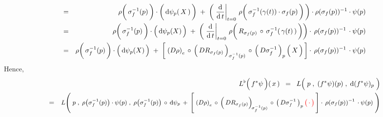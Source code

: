 \begin{eqnarray*}
& = &
    \rho\!\left(\,\overset{{\color{white}.}}{
        \sigma_{f}^{-1}(p)
        }\,\right)
    \cdot
    \left(\,\overset{{\color{white}1}}{
        \d\psi_{p}(\,X\,)
        }\,\right)
    \; + \;
    \left(\,
        \left.\dfrac{\d}{\d\,t}\right\vert_{t=0}
        \,
        \rho\!\left(\,\overset{{\color{white}.}}{
            \sigma_{f}^{-1}(\gamma(t))
            \cdot
            \sigma_{f}(p)
            }\,\right)
        \,\right)
    \cdot
    {\color{black}\rho(\sigma_{f}(p))^{-1}}
    \cdot
    \psi(p)
\\
& = &
    \rho\!\left(\,\overset{{\color{white}.}}{
        \sigma_{f}^{-1}(p)
        }\,\right)
    \cdot
    \left(\,\overset{{\color{white}.}}{
        \d\psi_{p}(X)
        }\,\right)
    \; + \;
    \left(\,
        \left.\dfrac{\d}{\d\,t}\right\vert_{t=0}
        \,
        \rho\!\left(\,\overset{{\color{white}.}}{
            R_{\sigma_{f}(p)}
            \,\circ\,
            \sigma_{f}^{-1}(\,\gamma(t)\,)
            }\,\right)
        \right)
    \cdot\,
    {\color{black}\rho(\sigma_{f}(p))^{-1}}
    \,\cdot
    \psi(p)
\\
& = &
    \rho\!\left(\,\overset{{\color{white}.}}{
        \sigma_{f}^{-1}(p)
        }\,\right)
    \cdot
    \left(\,\overset{{\color{white}.}}{
        \d\psi_{p}(X)
        }\,\right)
    \; + \;
    \left[\;
        \left(D\rho\right)_{e}
        \,\circ\,
        \left(\,D\overset{{\color{white}.}}{R_{\sigma_{f}(p)}}\,\right)_{\sigma_{f}^{-1}(p)}
        \,\circ\,
        \left(\,D\sigma_{f}^{-1}\,\right)_{p}
        \left(\,\overset{{\color{white}.}}{X}\,\right)
        \,\right]
    \cdot\,
    {\color{black}\rho(\sigma_{f}(p))^{-1}}
    \,\cdot
    \psi(p)
\end{eqnarray*}
Hence,
\begin{eqnarray*}
&&
    L^{\flat}\!\left(\,\overset{{\color{white}.}}{f^{*}\psi}\,\right)\!(\,x\,)
\;\; = \;\;
    L\!\left(\;
        \overset{{\color{white}1}}{p}
        \;,\;
        (f^{*}\psi)(p)
        \;,\;
        \d(f^{*}\psi)_{p}
        \;\right)
\\
& = &
    \textnormal{\small$
    L\!\left(\;
        p
        \;,\;
        \rho\!\left(\sigma_{f}^{-1}(p)\right)\cdot\psi(p)
        \;,\;
        \rho\!\left(\sigma_{f}^{-1}(p)\right)\,\circ\,\d\psi_{p}
        \,+\,
        \left[\;
            \left(D\rho\right)_{e}
            \,\circ\,
            \left(\,\overset{{\color{white}.}}{DR_{\sigma_{f}(p)}}\right)_{\!\sigma_{f}^{-1}(p)}
            \,\circ\,
            \left(\,D\sigma_{f}^{-1}\,\right)_{p}
            {\color{red}\left(\,\overset{{\color{white}.}}{\cdot}\,\right)}
            \,\right]
        \cdot\,
        {\color{black}\rho(\sigma_{f}(p))^{-1}}
        \,\cdot
        \psi(p)
        \;\right)
    $}
\end{eqnarray*}
